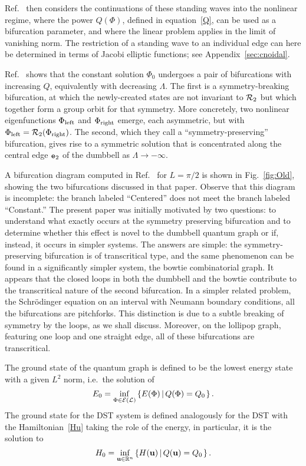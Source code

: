 \documentclass{article}
\numberwithin{equation}{section}
\numberwithin{figure}{section}
\begin{document}
Ref.~\cite{Marzuola:2016bl} then considers the continuations of these standing waves into the nonlinear regime, where the power $Q(\Phi)$, defined in equation~\eqref{Q}, can be used as a bifurcation parameter, and where the linear problem applies in the limit of vanishing norm. The restriction of a standing wave to an individual edge can here be determined in terms of Jacobi elliptic functions; see Appendix~\ref{sec:cnoidal}.

Ref.~\cite{Marzuola:2016bl} shows that the constant solution $\Phi_0$ undergoes a pair of bifurcations with increasing $Q$, equivalently with decreasing $\Lambda$. The first is a symmetry-breaking bifurcation, at which the newly-created states are not invariant to $\mathcal{R}_2$ but which together form a group orbit for that symmetry.  More concretely, two nonlinear eigenfunctions $\Phi_{\rm left}$ and $\Phi_{\rm right}$ emerge, each asymmetric, but with $\Phi_{\rm left} = \mathcal{R}_2(\Phi_{\rm right})$. The second, which they call a ``symmetry-preserving'' bifurcation, gives rise to a symmetric solution that is concentrated along the central edge $\mathtt{e}_2$ of the dumbbell as $\Lambda \to -\infty$. 

A bifurcation diagram computed in Ref.~\cite{Marzuola:2016bl} for $L= \pi/2$ is shown in Fig.~\ref{fig:Old}, showing the two bifurcations discussed in that paper. Observe that this diagram is incomplete: the branch labeled ``Centered'' does not meet the branch labeled ``Constant.'' The present paper was initially motivated by two questions: to understand what exactly occurs at the symmetry preserving bifurcation and to determine whether this effect is novel to the dumbbell quantum graph or if, instead, it occurs in simpler systems. The answers are simple: the symmetry-preserving bifurcation is of transcritical type, and the same phenomenon can be found in a significantly simpler system, the bowtie combinatorial graph. It appears that the closed loops in both the dumbbell and the bowtie contribute to the transcritical nature of the second bifurcation. In a simpler related problem, the Schr\"odinger equation on an interval with Neumann boundary conditions, all the bifurcations are pitchforks. This distinction is due to a subtle breaking of symmetry by the loops, as we shall discuss. Moreover, on the lollipop graph, featuring one loop and one straight edge, all of these bifurcations are transcritical.

The ground state of the quantum graph is defined to be the lowest energy state with a given $L^2$ norm, i.e.\ the solution of
\begin{equation}
E_0 = \inf_{\Phi \in \mathcal{E}(\mathcal{L})} \left\{ E(\Phi)  \left\lvert \, Q(\Phi) = Q_0 \right. \right \}.
\label{grounddef}
\end{equation}
The ground state for the DST system is defined analogously for the DST with the Hamiltonian~\eqref{Hu} taking the role of the energy, in particular, it is the solution to
$$
H_0 = \inf_{\mathbf{u} \in \mathbb{R}^n} \left\{ H(\mathbf{u})  \left\lvert \, Q(\mathbf{u}) = Q_0 \right. \right \}.
$$
\end{document}
